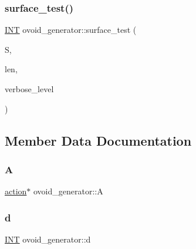 \mbox{\label{classovoid__generator_a51c565d0333a2cdf22acf473e91c77c2}} 
\subsubsection{\texorpdfstring{surface\+\_\+test()}{surface\_test()}}
{\footnotesize\ttfamily \mbox{\hyperlink{galois_8h_a09fddde158a3a20bd2dcadb609de11dc}{I\+NT}} ovoid\+\_\+generator\+::surface\+\_\+test (\begin{DoxyParamCaption}\item[{\mbox{\hyperlink{galois_8h_a09fddde158a3a20bd2dcadb609de11dc}{I\+NT}} $\ast$}]{S,  }\item[{\mbox{\hyperlink{galois_8h_a09fddde158a3a20bd2dcadb609de11dc}{I\+NT}}}]{len,  }\item[{\mbox{\hyperlink{galois_8h_a09fddde158a3a20bd2dcadb609de11dc}{I\+NT}}}]{verbose\+\_\+level }\end{DoxyParamCaption})}



\subsection{Member Data Documentation}
\mbox{\label{classovoid__generator_afb0f1277d15676523710fd8349640469}} 
\subsubsection{\texorpdfstring{A}{A}}
{\footnotesize\ttfamily \mbox{\hyperlink{classaction}{action}}$\ast$ ovoid\+\_\+generator\+::A}

\mbox{\label{classovoid__generator_a5f6aeac2598b96009dac826dffb9944b}} 
\subsubsection{\texorpdfstring{d}{d}}
{\footnotesize\ttfamily \mbox{\hyperlink{galois_8h_a09fddde158a3a20bd2dcadb609de11dc}{I\+NT}} ovoid\+\_\+generator\+::d}

